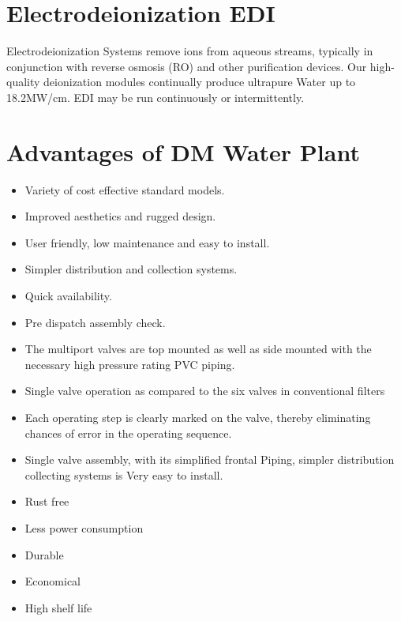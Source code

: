\documentclass[english,11pt]{report}
\begin{document}
\section{Electrodeionization EDI}
Electrodeionization Systems remove ions from aqueous streams, typically in conjunction with reverse osmosis (RO) and other purification devices. Our high-quality deionization modules continually produce ultrapure Water up to 18.2MW/cm. EDI may be run continuously or intermittently.
\section{Advantages of DM Water Plant}
\begin{itemize}
    \item Variety of cost effective standard models.
    \item Improved aesthetics and rugged design.
    \item User friendly, low maintenance and easy to install.
    \item Simpler distribution and collection systems.
    \item Quick availability.
    \item Pre dispatch assembly check.
    \item The multiport valves are top mounted as well as side mounted with the necessary high pressure rating PVC piping.
    \item Single valve operation as compared to the six valves in conventional filters
    \item Each operating step is clearly marked on the valve, thereby eliminating chances of error in the operating sequence.
    \item Single valve assembly, with its simplified frontal Piping, simpler distribution collecting systems is Very easy to install.
    \item Rust free
    \item Less power consumption
    \item Durable
    \item Economical
    \item High shelf life
\end{itemize}
\end{document}
